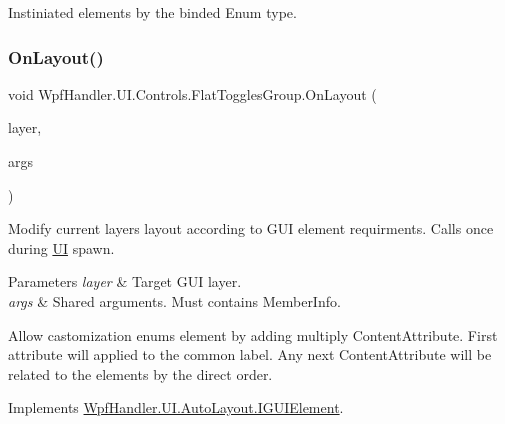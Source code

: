 Instiniated elements by the binded Enum type. 

\mbox{\label{class_wpf_handler_1_1_u_i_1_1_controls_1_1_flat_toggles_group_a5619e5107d6cbc3fb2cdabb21deb40a4}} 
\subsubsection{\texorpdfstring{On\+Layout()}{OnLayout()}}
{\footnotesize\ttfamily void Wpf\+Handler.\+U\+I.\+Controls.\+Flat\+Toggles\+Group.\+On\+Layout (\begin{DoxyParamCaption}\item[{ref \mbox{\hyperlink{class_wpf_handler_1_1_u_i_1_1_auto_layout_1_1_layout_layer}{Layout\+Layer}}}]{layer,  }\item[{params object \mbox{[}$\,$\mbox{]}}]{args }\end{DoxyParamCaption})}



Modify current layer\textquotesingle{}s layout according to G\+UI element requirments. Calls once during \mbox{\hyperlink{namespace_wpf_handler_1_1_u_i}{UI}} spawn. 


\begin{DoxyParams}{Parameters}
{\em layer} & Target G\+UI layer.\\
\hline
{\em args} & Shared arguments. Must contains Member\+Info.\\
\hline
\end{DoxyParams}


Allow castomization enum\textquotesingle{}s element by adding multiply Content\+Attribute. First attribute will applied to the common label. Any next Content\+Attribute will be related to the elements by the direct order. 

Implements \mbox{\hyperlink{interface_wpf_handler_1_1_u_i_1_1_auto_layout_1_1_i_g_u_i_element_a0ff16956f8e8187d51e1b36b6b9f894e}{Wpf\+Handler.\+U\+I.\+Auto\+Layout.\+I\+G\+U\+I\+Element}}.

\mbox{\label{class_wpf_handler_1_1_u_i_1_1_controls_1_1_flat_toggles_group_a614b0a059caad9bc0704342bae1bb7f5}} 
